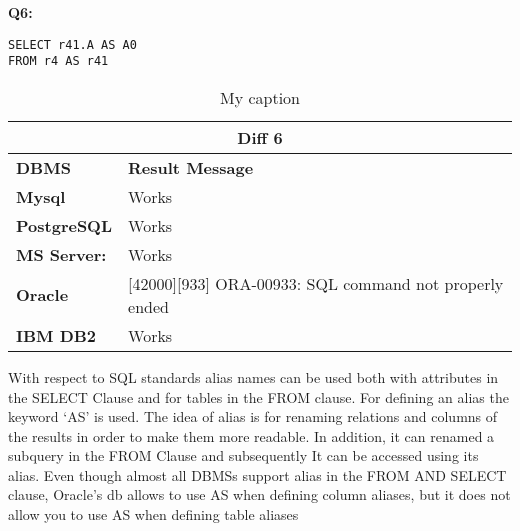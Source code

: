 \begin{mdframed}[backgroundcolor=lightgray!20] 
\textbf{Q6:}
\begin{lstlisting}
SELECT r41.A AS A0
FROM r4 AS r41
\end{lstlisting}
\end{mdframed}

\begin{table}[h]
\centering
\caption{My caption}
\label{my-label}
\begin{tabular}{|p{2cm}|p{12cm}|}
\hline
\multicolumn{2}{|c|}{\textbf{Diff 6}}                                                                       \\ \hline
\textbf{DBMS}                              & \textbf{Result Message}                                        \\ \hline
{\color[HTML]{333333} \textbf{Mysql}}      & {\color[HTML]{333333} Works}                                   \\ \hline
{\color[HTML]{333333} \textbf{PostgreSQL}} & {\color[HTML]{333333} Works}                                   \\ \hline
{\color[HTML]{333333} \textbf{MS Server:}} & {\color[HTML]{333333} Works}                                   \\ \hline
\textbf{Oracle}                            & {[}42000{]}{[}933{]} ORA-00933: SQL command not properly ended \\ \hline
\textbf{IBM DB2}                           & Works                                                          \\ \hline
\end{tabular}
\end{table}


With respect to SQL standards alias names can be used both with attributes in the SELECT Clause and for tables in the FROM clause. For defining an alias the keyword ‘AS’ is used. The idea of alias is for renaming relations and columns of the results in order to make them more readable. In addition, it can renamed a subquery in the FROM Clause and subsequently It can be accessed using its alias. Even though almost all DBMSs support alias in the FROM AND SELECT clause, Oracle’s db  allows to use AS when defining column aliases, but it does not allow you to use AS when defining table aliases 




